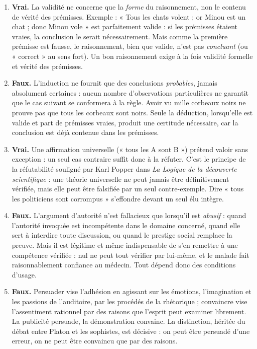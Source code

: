 \documentclass[11pt]{article}
\newcommand{\cle}[1]{{\popxbold\color{popdark}#1}}
\begin{document}
\begin{corrige}
\begin{enumerate}
\item \textbf{Vrai.} La validité ne concerne que la \emph{forme} du raisonnement, non le contenu de vérité des prémisses. Exemple : « Tous les chats volent ; or Minou est un chat ; donc Minou vole » est parfaitement valide : si les prémisses étaient vraies, la conclusion le serait nécessairement. Mais comme la première prémisse est fausse, le raisonnement, bien que valide, n'est pas \emph{concluant} (ou « correct » au sens fort). Un bon raisonnement exige à la fois validité formelle et vérité des prémisses.
\item \textbf{Faux.} L'induction ne fournit que des conclusions \emph{probables}, jamais absolument certaines : aucun nombre d'observations particulières ne garantit que le cas suivant se conformera à la règle. Avoir vu mille corbeaux noirs ne prouve pas que tous les corbeaux sont noirs. Seule la déduction, lorsqu'elle est valide et part de prémisses vraies, produit une certitude nécessaire, car la conclusion est déjà contenue dans les prémisses.
\item \textbf{Vrai.} Une affirmation universelle (« tous les A sont B ») prétend valoir sans exception : un seul cas contraire suffit donc à la réfuter. C'est le principe de la \cle{réfutabilité} souligné par Karl Popper dans \emph{La Logique de la découverte scientifique} : une théorie universelle ne peut jamais être définitivement vérifiée, mais elle peut être falsifiée par un seul contre-exemple. Dire « tous les politiciens sont corrompus » s'effondre devant un seul élu intègre.
\item \textbf{Faux.} L'\cle{argument d'autorité} n'est fallacieux que lorsqu'il est \emph{abusif} : quand l'autorité invoquée est incompétente dans le domaine concerné, quand elle sert à interdire toute discussion, ou quand le prestige social remplace la preuve. Mais il est légitime et même indispensable de s'en remettre à une compétence vérifiée : nul ne peut tout vérifier par lui-même, et le malade fait raisonnablement confiance au médecin. Tout dépend donc des conditions d'usage.
\item \textbf{Faux.} \cle{Persuader} vise l'adhésion en agissant sur les émotions, l'imagination et les passions de l'auditoire, par les procédés de la rhétorique ; \cle{convaincre} vise l'assentiment rationnel par des raisons que l'esprit peut examiner librement. La publicité persuade, la démonstration convainc. La distinction, héritée du débat entre Platon et les sophistes, est décisive : on peut être persuadé d'une erreur, on ne peut être convaincu que par des raisons.
\end{enumerate}
\end{corrige}
\end{document}
